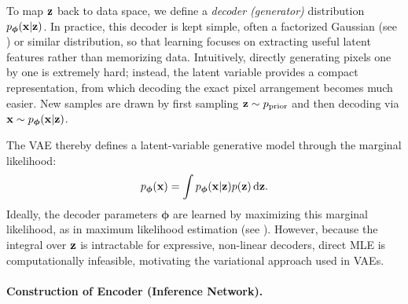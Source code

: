 To map ${\mathbf{z}}$ back to data space, we define a \emph{decoder (generator)} distribution 
$p_{\bm{\phi}}({\mathbf{x}}|{\mathbf{z}})$. In practice, this decoder is kept simple, often a 
factorized Gaussian (see ) or similar distribution, so that learning focuses on extracting 
useful latent features rather than memorizing data. 
Intuitively, directly generating pixels one by one is extremely hard; instead, the 
latent variable provides a compact representation, 
from which decoding the exact pixel arrangement becomes much easier. 
New samples are drawn by first sampling ${\mathbf{z}} \sim p_{\text{prior}}$ and then 
decoding via ${\mathbf{x}} \sim p_{\bm{\phi}}({\mathbf{x}}|{\mathbf{z}})$.

The VAE thereby defines a latent-variable generative model through the marginal likelihood:
\[
p_{\bm{\phi}}({\mathbf{x}}) = \int p_{\bm{\phi}}({\mathbf{x}}|{\mathbf{z}}) p({\mathbf{z}}) \mathop{}\!\mathrm{d} {\mathbf{z}}.
\]
Ideally, the decoder parameters $\bm{\phi}$ are learned by maximizing this marginal 
likelihood, as in maximum likelihood estimation (see ). 
However, because the integral over ${\mathbf{z}}$ is intractable for expressive, non-linear 
decoders, direct MLE is computationally infeasible, motivating the variational 
approach used in VAEs.




\paragraph{Construction of Encoder (Inference Network).}



